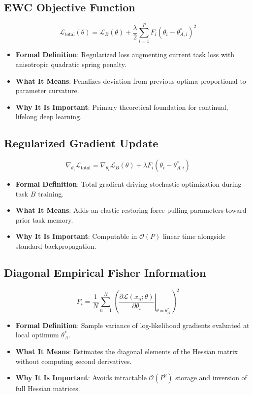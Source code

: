 \documentclass[11pt,a4paper]{article}
\theoremstyle{definition}
\begin{document}
\subsection{EWC Objective Function}
{\boldmath
\begin{equation}
\mathcal{L}_{\text{total}}(\theta) = \mathcal{L}_B(\theta) + \frac{\lambda}{2} \sum_{i=1}^P F_i (\theta_i - \theta_{A, i}^*)^2
\end{equation}
}
\begin{itemize}
    \item \textbf{Formal Definition}: Regularized loss augmenting current task loss with anisotropic quadratic spring penalty.
    \item \textbf{What It Means}: Penalizes deviation from previous optima proportional to parameter curvature.
    \item \textbf{Why It Is Important}: Primary theoretical foundation for continual, lifelong deep learning.
\end{itemize}

\subsection{Regularized Gradient Update}
{\boldmath
\begin{equation}
\nabla_{\theta_i} \mathcal{L}_{\text{total}} = \nabla_{\theta_i} \mathcal{L}_B(\theta) + \lambda F_i (\theta_i - \theta_{A, i}^*)
\end{equation}
}
\begin{itemize}
    \item \textbf{Formal Definition}: Total gradient driving stochastic optimization during task $B$ training.
    \item \textbf{What It Means}: Adds an elastic restoring force pulling parameters toward prior task memory.
    \item \textbf{Why It Is Important}: Computable in $\mathcal{O}(P)$ linear time alongside standard backpropagation.
\end{itemize}

\subsection{Diagonal Empirical Fisher Information}
{\boldmath
\begin{equation}
F_i = \frac{1}{N} \sum_{n=1}^N \left( \left. \frac{\partial \mathcal{L}(x_n; \theta)}{\partial \theta_i} \right|_{\theta = \theta_A^*} \right)^2
\end{equation}
}
\begin{itemize}
    \item \textbf{Formal Definition}: Sample variance of log-likelihood gradients evaluated at local optimum $\theta_A^*$.
    \item \textbf{What It Means}: Estimates the diagonal elements of the Hessian matrix without computing second derivatives.
    \item \textbf{Why It Is Important}: Avoids intractable $\mathcal{O}(P^2)$ storage and inversion of full Hessian matrices.
\end{itemize}
\end{document}

